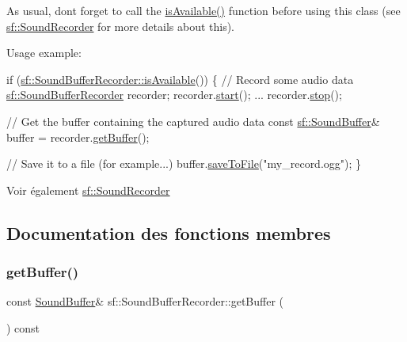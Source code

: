 As usual, don\textquotesingle{}t forget to call the \hyperlink{classsf_1_1SoundRecorder_aab2bd0fee9e48d6cfd449b1cb078ce5a}{is\+Available()} function before using this class (see \hyperlink{classsf_1_1SoundRecorder}{sf\+::\+Sound\+Recorder} for more details about this).

Usage example\+: 
\begin{DoxyCode}
\textcolor{keywordflow}{if} (\hyperlink{classsf_1_1SoundRecorder_aab2bd0fee9e48d6cfd449b1cb078ce5a}{sf::SoundBufferRecorder::isAvailable}())
\{
    \textcolor{comment}{// Record some audio data}
    \hyperlink{classsf_1_1SoundBufferRecorder}{sf::SoundBufferRecorder} recorder;
    recorder.\hyperlink{classsf_1_1SoundRecorder_a715f0fd2f228c83d79aaedca562ae51f}{start}();
    ...
    recorder.\hyperlink{classsf_1_1SoundRecorder_a8d9c8346aa9aa409cfed4a1101159c4c}{stop}();

    \textcolor{comment}{// Get the buffer containing the captured audio data}
    \textcolor{keyword}{const} \hyperlink{classsf_1_1SoundBuffer}{sf::SoundBuffer}& buffer = recorder.\hyperlink{classsf_1_1SoundBufferRecorder_aa3a8d7a612cb885ed2f58bb86aa24acb}{getBuffer}();

    \textcolor{comment}{// Save it to a file (for example...)}
    buffer.\hyperlink{classsf_1_1SoundBuffer_aade64260c6375580a085314a30be007e}{saveToFile}(\textcolor{stringliteral}{"my\_record.ogg"});
\}
\end{DoxyCode}


\begin{DoxySeeAlso}{Voir également}
\hyperlink{classsf_1_1SoundRecorder}{sf\+::\+Sound\+Recorder} 
\end{DoxySeeAlso}


\subsection{Documentation des fonctions membres}
\mbox{\label{classsf_1_1SoundBufferRecorder_aa3a8d7a612cb885ed2f58bb86aa24acb}} 
\subsubsection{\texorpdfstring{get\+Buffer()}{getBuffer()}}
{\footnotesize\ttfamily const \hyperlink{classsf_1_1SoundBuffer}{Sound\+Buffer}\& sf\+::\+Sound\+Buffer\+Recorder\+::get\+Buffer (\begin{DoxyParamCaption}{ }\end{DoxyParamCaption}) const}



